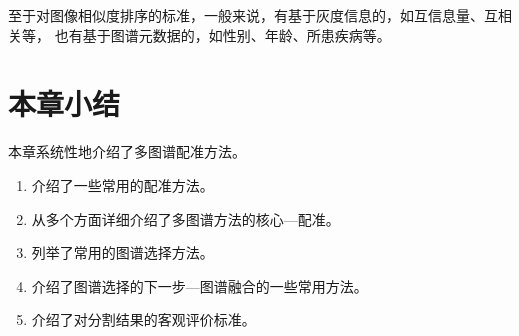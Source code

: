 至于对图像相似度排序的标准，一般来说，有基于灰度信息的，如互信息量、互相关等，
也有基于图谱元数据的，如性别、年龄、所患疾病等。






\section{本章小结}
本章系统性地介绍了多图谱配准方法。
\begin{enumerate}
  \item 介绍了一些常用的配准方法。
  \item 从多个方面详细介绍了多图谱方法的核心---配准。
  \item 列举了常用的图谱选择方法。
  \item 介绍了图谱选择的下一步---图谱融合的一些常用方法。
  \item 介绍了对分割结果的客观评价标准。
\end{enumerate}

